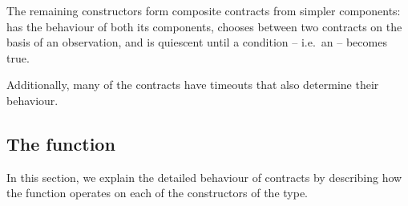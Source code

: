 \documentclass[runningheads]{llncs}
\begin{document}
The remaining constructors form composite contracts from simpler components:  has the behaviour of 
both its components,  chooses between two contracts on the basis of an observation, and 
 is quiescent until a condition -- i.e.\ an  -- becomes true.

Additionally, many of the contracts have timeouts that also determine their behaviour. 
\subsection{The  function}

In this section, we explain the detailed behaviour of contracts by describing how the  function 
operates on each of the constructors of the   type.
\end{document}
